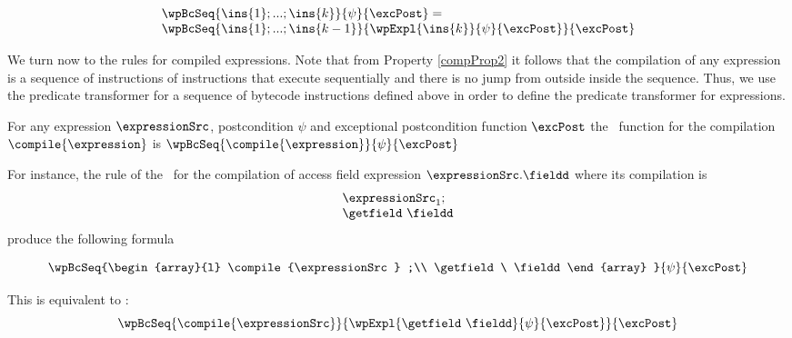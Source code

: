 \begin{wpSeq}\label{wpSeq}
     $$ \begin{array}{l} 
              \wpBcSeq{ \ins{1};...;\ins{k}}{ \psi  } { \excPost } =\\
              \wpBcSeq{\ins{1};...;\ins{k -1} }{ \wpExpl{ \ins{k} }{ \psi }{ \excPost} }{\excPost} 
        \end{array}$$ 

\end{wpSeq}



We turn now to the rules for compiled expressions. Note that from Property \ref{compProp2} it follows that 
the compilation of any expression is a sequence of instructions of instructions that execute sequentially and there is no jump from outside inside 
the sequence. Thus, we use 
the predicate transformer  for a sequence of bytecode instructions defined above in order to define 
the predicate transformer for  expressions. 

\begin{wpExpr} \label{wpExpr}
               For any expression $\expressionSrc$, postcondition $\psi$ and exceptional postcondition function
               $\excPost$ the \wpName \ function for the compilation $\compile{\expression}$  is
               $ \wpBcSeq{\compile{\expression} }{ \psi  } { \excPost }  $
 \end{wpExpr}

For instance, the  rule of the \wpName  \ for the compilation of access  field expression $\expressionSrc.\fieldd $ 
where its compilation is 
$$\begin{array}{l}
     \expressionSrc_1;\\
     \getfield \ \fieldd \\
 \end{array}
$$
  produce the following formula 

$$  \wpBcSeq{\begin{array}{l}
	              \compile{\expressionSrc } ;\\
	             \getfield \ \fieldd 
	           \end{array} }{ \psi  } { \excPost } $$	

This is equivalent to :
  $$\wpBcSeq{\compile{\expressionSrc}}{\wpExpl{\getfield \ \fieldd }{\psi}{\excPost} }{\excPost} $$  





